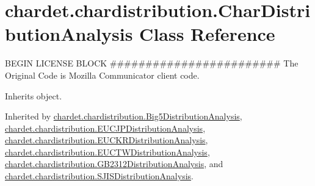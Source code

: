 \hypertarget{classchardet_1_1chardistribution_1_1_char_distribution_analysis}{}\section{chardet.\+chardistribution.\+Char\+Distribution\+Analysis Class Reference}
\label{classchardet_1_1chardistribution_1_1_char_distribution_analysis}


B\+E\+G\+IN L\+I\+C\+E\+N\+SE B\+L\+O\+CK \#\#\#\#\#\#\#\#\#\#\#\#\#\#\#\#\#\#\#\#\#\#\#\# The Original Code is Mozilla Communicator client code.  




Inherits object.



Inherited by \hyperlink{classchardet_1_1chardistribution_1_1_big5_distribution_analysis}{chardet.\+chardistribution.\+Big5\+Distribution\+Analysis}, \hyperlink{classchardet_1_1chardistribution_1_1_e_u_c_j_p_distribution_analysis}{chardet.\+chardistribution.\+E\+U\+C\+J\+P\+Distribution\+Analysis}, \hyperlink{classchardet_1_1chardistribution_1_1_e_u_c_k_r_distribution_analysis}{chardet.\+chardistribution.\+E\+U\+C\+K\+R\+Distribution\+Analysis}, \hyperlink{classchardet_1_1chardistribution_1_1_e_u_c_t_w_distribution_analysis}{chardet.\+chardistribution.\+E\+U\+C\+T\+W\+Distribution\+Analysis}, \hyperlink{classchardet_1_1chardistribution_1_1_g_b2312_distribution_analysis}{chardet.\+chardistribution.\+G\+B2312\+Distribution\+Analysis}, and \hyperlink{classchardet_1_1chardistribution_1_1_s_j_i_s_distribution_analysis}{chardet.\+chardistribution.\+S\+J\+I\+S\+Distribution\+Analysis}.

